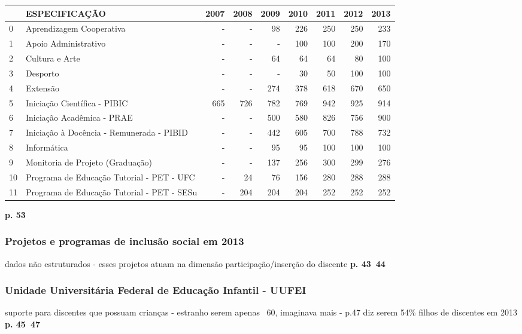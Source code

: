 \documentclass{article}
\begin{document}
\begin{tabular}{llrrrrrrr}
\toprule
{} &                               ESPECIFICAÇÃO &  2007 &  2008 &  2009 &  2010 &  2011 &  2012 &  2013 \\
\midrule
0  &                    Aprendizagem Cooperativa &     - &     - &    98 &   226 &   250 &   250 &   233 \\
1  &                        Apoio Administrativo &     - &     - &     - &   100 &   100 &   200 &   170 \\
2  &                              Cultura e Arte &     - &     - &    64 &    64 &    64 &    80 &   100 \\
3  &                                    Desporto &     - &     - &     - &    30 &    50 &   100 &   100 \\
4  &                                    Extensão &     - &     - &   274 &   378 &   618 &   670 &   650 \\
5  &                Iniciação Científica - PIBIC &   665 &   726 &   782 &   769 &   942 &   925 &   914 \\
6  &                  Iniciação Acadêmica - PRAE &     - &     - &   500 &   580 &   826 &   756 &   900 \\
7  &   Iniciação à Docência - Remunerada - PIBID &     - &     - &   442 &   605 &   700 &   788 &   732 \\
8  &                                 Informática &     - &     - &    95 &    95 &   100 &   100 &   100 \\
9  &            Monitoria de Projeto (Graduação) &     - &     - &   137 &   256 &   300 &   299 &   276 \\
10 &   Programa de Educação Tutorial - PET - UFC &     - &    24 &    76 &   156 &   280 &   288 &   288 \\
11 &  Programa de Educação Tutorial - PET - SESu &     - &   204 &   204 &   204 &   252 &   252 &   252 \\
\bottomrule
\end{tabular}

\textbf{p. 53}

\subsubsection{Projetos e programas de inclusão social em 2013}
dados não estruturados - esses projetos atuam na dimensão participação/inserção do discente
\textbf{p. 43~44}

\subsubsection{Unidade Universitária Federal de Educação Infantil - UUFEI}
suporte para discentes que possuam crianças - estranho serem apenas ~60, imaginava mais - p.47 diz serem 54\% filhos de discentes em 2013
\textbf{p. 45~47}
\end{document}
